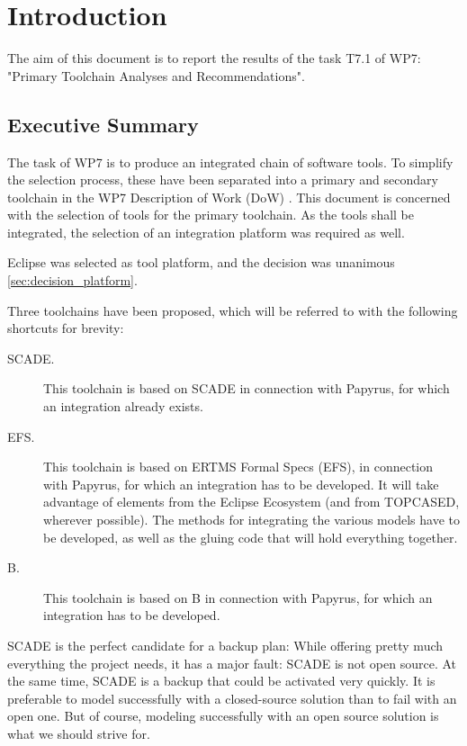 

\chapter{Introduction}
\label{sec:intro}

The aim of this document is to report the results of the task T7.1 of WP7:  "Primary Toolchain Analyses and Recommendations".

\section{Executive Summary}

The task of WP7 is to produce an integrated chain of software tools.  To simplify the selection process, these have been separated into a primary and secondary toolchain in the WP7 Description of Work (DoW) \citep{WP7_D01}.  This document is concerned with the selection of tools for the primary toolchain.  As the tools shall be integrated, the selection of an integration platform was required as well.

Eclipse was selected as tool platform, and the decision was unanimous \ref{sec:decision_platform}.

Three toolchains have been proposed, which will be referred to with the following shortcuts for brevity:

\begin{description}
\item[SCADE.] This toolchain is based on SCADE in connection with Papyrus, for which an integration already exists.

\item[EFS.] This toolchain is based on ERTMS Formal Specs (EFS), in connection with Papyrus, for which an integration has to be developed.  It will take advantage of elements from the Eclipse Ecosystem (and from TOPCASED, wherever possible).  The methods for integrating the various models have to be developed, as well as the gluing code that will hold everything together.

\item[B.] This toolchain is based on B in connection with Papyrus, for which an integration has to be developed.

\end{description}

SCADE is the perfect candidate for a backup plan: While offering pretty much everything the project needs, it has a major fault: SCADE is not open source.  At the same time, SCADE is a backup that could be activated very quickly.  It is preferable to model successfully with a closed-source solution than to fail with an open one.  But of course, modeling successfully with an open source solution is what we should strive for.

